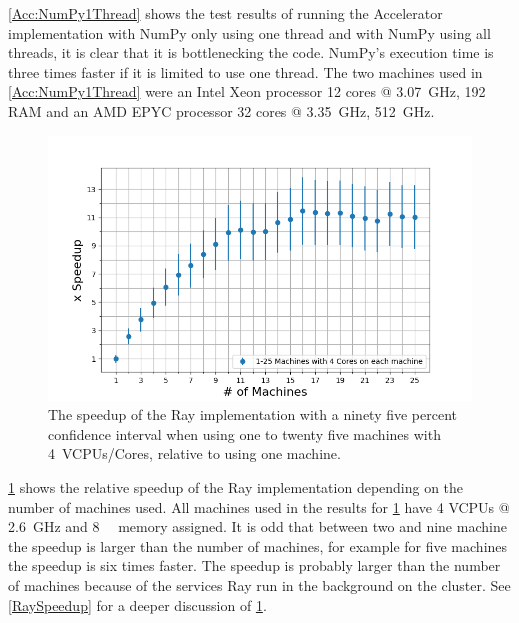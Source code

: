\documentclass[12pt, a4paper]{article}
\begin{document}
\cref{Acc:NumPy1Thread} shows the test results of running the Accelerator implementation with NumPy only using one thread and with NumPy using all threads, it is clear that it is bottlenecking the code.
NumPy's execution time is three times faster if it is limited to use one thread.
The two machines used in \cref{Acc:NumPy1Thread} were an Intel Xeon processor 12 cores @ \SI{3.07}{\giga\hertz}, \SI{192}{\giga\byte} RAM and an AMD EPYC processor 32 cores @ \SI{3.35}{\giga\hertz}, \SI{512}{\giga\hertz}.

\begin{figure}[H]
    \centering
    \includegraphics[width=1.0\textwidth, ]{pictures/MachinesXSpeedupWhite.png}
    \caption{The speedup of the Ray implementation with a ninety five percent confidence interval when using one to twenty five machines with \SI{4}{VCPUs/Cores}, relative to using one machine.}
    \label{fig:MachineXSpeedup}
\end{figure}

\cref{fig:MachineXSpeedup} shows the relative speedup of the Ray implementation depending on the number of machines used.
All machines used in the results for \cref{fig:MachineXSpeedup} have 4 VCPUs @ \SI{2.6}{\giga\hertz} and \SI{8}{\giga\byte} memory assigned.
It is odd that between two and nine machine the speedup is larger than the number of machines, for example for five machines the speedup is six times faster.
The speedup is probably larger than the number of machines because of the services Ray run in the background on the cluster.
See \cref{RaySpeedup} for a deeper discussion of \cref{fig:MachineXSpeedup}.
\end{document}

